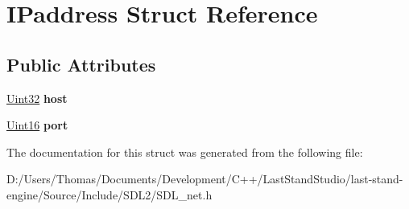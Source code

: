 \hypertarget{structIPaddress}{}\section{I\+Paddress Struct Reference}
\label{structIPaddress}
\subsection*{Public Attributes}
\begin{DoxyCompactItemize}
\item 
\hypertarget{structIPaddress_ad3cb0c0b0865e70e775bca4b495cd830}{}\hyperlink{SDL__stdinc_8h_add440eff171ea5f55cb00c4a9ab8672d}{Uint32} {\bfseries host}\label{structIPaddress_ad3cb0c0b0865e70e775bca4b495cd830}

\item 
\hypertarget{structIPaddress_a259fca12fc0a16b3e5172b2fc4674331}{}\hyperlink{SDL__stdinc_8h_a31fcc0a076c9068668173ee26d33e42b}{Uint16} {\bfseries port}\label{structIPaddress_a259fca12fc0a16b3e5172b2fc4674331}

\end{DoxyCompactItemize}


The documentation for this struct was generated from the following file\+:\begin{DoxyCompactItemize}
\item 
D\+:/\+Users/\+Thomas/\+Documents/\+Development/\+C++/\+Last\+Stand\+Studio/last-\/stand-\/engine/\+Source/\+Include/\+S\+D\+L2/S\+D\+L\+\_\+net.\+h\end{DoxyCompactItemize}
